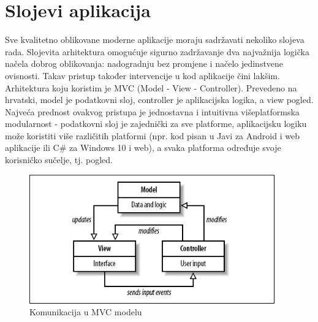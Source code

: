 \documentclass[times, utf8, zavrsni, numeric]{fer}
\begin{document}
\chapter{Slojevi aplikacija}
Sve kvalitetno oblikovane moderne aplikacije moraju sadržavati nekoliko slojeva rada. Slojevita arhitektura omogućuje sigurno zadržavanje dva najvažnija logička načela dobrog oblikovanja: nadogradnju bez promjene i načelo jedinstvene ovisnosti. Takav pristup također intervencije u kod aplikacije čini lakšim. Arhitektura koju koristim je MVC (Model - View - Controller). Prevedeno na hrvatski, model je podatkovni sloj, controller je aplikacijska logika, a view pogled. Najveća prednost ovakvog pristupa je jednostavna i intuitivna višeplatformska modularnost - podatkovni sloj je zajednički za sve platforme, aplikacijsku logiku može koristiti više različitih platformi (npr. kod pisan u Javi za Android i web aplikacije ili C\# za Windows 10 i web), a svaka platforma određuje svoje korisničko sučelje, tj. pogled.\cite{mvc}

\begin{figure}[htb]
	\centering
	\includegraphics[]{img/mvc.jpg}
	\caption{Komunikacija u MVC modelu\cite{mvccommpic}}
	\label{fig:mvc}
\end{figure}
\end{document}
